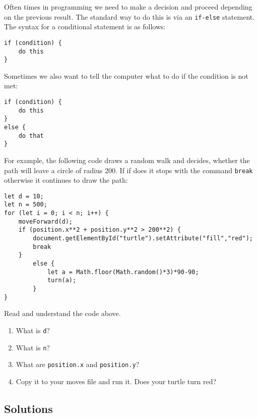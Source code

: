 \documentclass[english,11pt,a4paper]{report}
\begin{document}
Often times in programming we need to make a decision and proceed depending on the previous result.  The standard way to do this is via an \verb|if-else| statement.  The syntax for a conditional statement is as follows:
\begin{verbatim}
if (condition) {
    do this
}
\end{verbatim}
Sometimes we also want to tell the computer what to do if the condition is not met:
\begin{verbatim}
if (condition) {
    do this
}
else {
    do that
}
\end{verbatim}
For example, the following code draws a random walk and decides, whether the path will leave a circle of radius 200. If if does it stops with the command \verb|break| otherwise it continues to draw the path:
\begin{verbatim}
let d = 10;
let n = 500;
for (let i = 0; i < n; i++) {
    moveForward(d);
    if (position.x**2 + position.y**2 > 200**2) {
        document.getElementById("turtle").setAttribute("fill","red");
        break
    }
        else {
            let a = Math.floor(Math.random()*3)*90-90;
            turn(a);
        }
}
\end{verbatim}

\begin{ex}
Read and understand the code above. 
\begin{enumerate}
\item What is \verb|d|?
\item What is \verb|n|?
\item What are \verb|position.x| and \verb|position.y|?
\item Copy it to your moves file and run it. Does your turtle turn red?
\end{enumerate}
\end{ex}

\newpage

\subsection*{Solutions}
\printcursols
\end{document}
